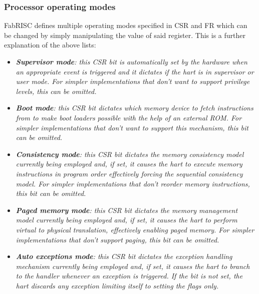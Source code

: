         \subsubsection{Processor operating modes}

            \vspace{10pt}

            FabRISC defines multiple operating modes specified in CSR and FR which can be changed by simply manipulating the value of said register. This is a further explanation of the above lists:

            \begin{itemize}

                \item \textit{\textbf{Supervisor mode}: this CSR bit is automatically set by the hardware when an appropriate event is triggered and it dictates if the hart is in supervisor or user mode. For simpler implementations that don't want to support privilege levels, this can be omitted.}

                \item \textit{\textbf{Boot mode}: this CSR bit dictates which memory device to fetch instructions from to make boot loaders possible with the help of an external ROM. For simpler implementations that don't want to support this mechanism, this bit can be omitted.}

                \item \textit{\textbf{Consistency mode}: this CSR bit dictates the memory consistency model currently being employed and, if set, it causes the hart to execute memory instructions in program order effectively forcing the sequential consistency model. For simpler implementations that don't reorder memory instructions, this bit can be omitted.}

                \item \textit{\textbf{Paged memory mode}: this CSR bit dictates the memory management model currently being employed and, if set, it causes the hart to perform virtual to physical translation, effectively enabling paged memory. For simpler implementations that don't support paging, this bit can be omitted.}

                \item \textit{\textbf{Auto exceptions mode}: this CSR bit dictates the exception handling mechanism currently being employed and, if set, it causes the hart to branch to the handler whenever an exception is triggered. If the bit is not set, the hart discards any exception limiting itself to setting the flags only.}


\end{itemize}
